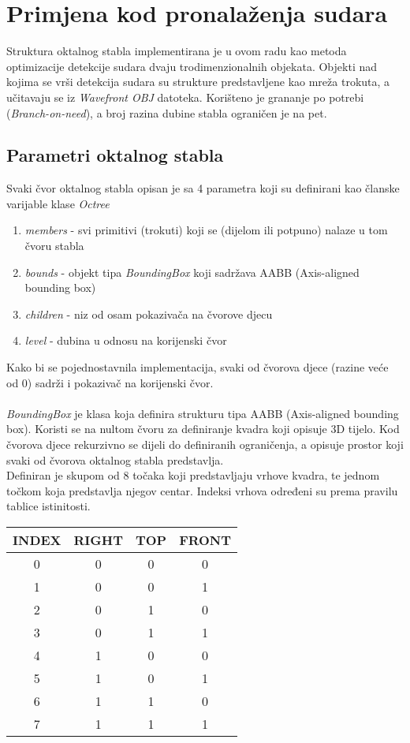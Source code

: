 \section{Primjena kod pronalaženja sudara}

Struktura oktalnog stabla implementirana je u ovom radu kao metoda optimizacije detekcije sudara dvaju trodimenzionalnih objekata.
Objekti nad kojima se vrši detekcija sudara su strukture predstavljene kao mreža trokuta, a učitavaju se iz \textit{Wavefront OBJ} datoteka.
Korišteno je grananje po potrebi (\textit{Branch-on-need}), a broj razina dubine stabla ograničen je na pet.
\pagebreak
\subsection{Parametri oktalnog stabla}

Svaki čvor oktalnog stabla opisan je sa 4 parametra koji su definirani kao članske varijable klase \textit{Octree}

\begin{enumerate}
  \item \textit{members} - svi primitivi (trokuti) koji se (dijelom ili potpuno) nalaze u tom čvoru stabla
  \item \textit{bounds} - objekt tipa \textit{BoundingBox} koji sadržava AABB (Axis-aligned bounding box)
  \item \textit{children} - niz od osam pokazivača na čvorove djecu
  \item \textit{level} - dubina u odnosu na korijenski čvor
\end{enumerate}

Kako bi se pojednostavnila implementacija, svaki od čvorova djece (razine veće od 0) sadrži i pokazivač na korijenski čvor.
\\\\
\textit{BoundingBox} je klasa koja definira strukturu tipa AABB (Axis-aligned bounding box). Koristi se na nultom čvoru za definiranje
kvadra koji opisuje 3D tijelo. Kod čvorova djece rekurzivno se dijeli do definiranih ograničenja, a opisuje prostor koji svaki od 
čvorova oktalnog stabla predstavlja.\\
Definiran je skupom od 8 točaka koji predstavljaju vrhove kvadra, te jednom točkom koja predstavlja njegov centar.
Indeksi vrhova određeni su prema pravilu tablice istinitosti.
\begin{center}
  \begin{tabular}{ c | c | c | c }
    \textbf{INDEX} & \textbf{RIGHT} & \textbf{TOP} & \textbf{FRONT} \\
    \hline
    0 & 0 & 0 & 0 \\
    1 & 0 & 0 & 1 \\
    2 & 0 & 1 & 0 \\
    3 & 0 & 1 & 1 \\
    4 & 1 & 0 & 0 \\
    5 & 1 & 0 & 1 \\
    6 & 1 & 1 & 0 \\
    7 & 1 & 1 & 1
  \end{tabular}
\end{center}

